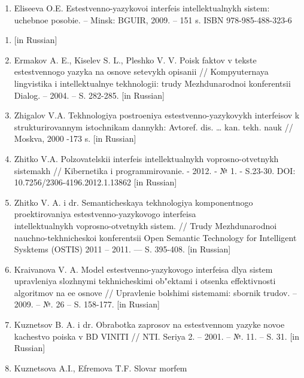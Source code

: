\begin{noparindent}
\begin{enumerate}
\def\labelenumi{\arabic{enumi}.}
\setcounter{enumi}{17}
\item
  Eliseeva O.E. Estestvenno-yazykovoi interfeis
  intellektual\textquotesingle nykh sistem: uchebnoe posobie. -- Minsk:
  BGUIR, 2009. -- 151 s. ISBN 978-985-488-323-6
\end{enumerate}

\begin{enumerate}
\def\labelenumi{\arabic{enumi}.}
\item
  {[}in Russian{]}
\item
  Ermakov A. E., Kiselev S. L., Pleshko V. V. Poisk faktov v tekste
  estestvennogo yazyka na osnove setevykh opisanii //
  Komp\textquotesingle yuternaya lingvistika i
  intellektual\textquotesingle nye tekhnologii: trudy Mezhdunarodnoi
  konferentsii Dialog. -- 2004. -- S. 282-285. {[}in Russian{]}
\item
  Zhigalov V.A. Tekhnologiya postroeniya estestvenno-yazykovykh
  interfeisov k strukturirovannym istochnikam dannykh: Avtoref. dis.
  \ldots{} kan. tekh. nauk // Moskva, 2000 -173 s. {[}in Russian{]}
\item
  Zhitko V.A. Pol\textquotesingle zovatel\textquotesingle skii interfeis
  intellektual\textquotesingle nykh voprosno-otvetnykh sistemakh //
  Kibernetika i programmirovanie. - 2012. - № 1. - S.23-30. DOI:
  10.7256/2306-4196.2012.1.13862 {[}in Russian{]}
\item
  Zhitko V. A. i dr. Semanticheskaya tekhnologiya komponentnogo
  proektirovaniya estestvenno-yazykovogo interfeisa
  \\intellektual\textquotesingle nykh voprosno-otvetnykh sistem. // Trudy
  Mezhdunarodnoi nauchno-tekhnicheskoi konferentsii Open Semantic
  Technology for Intelligent Sysktems (OSTIS) 2011 -- 2011. --- S.
  395-408. {[}in Russian{]}
\item
  Kraivanova V. A. Model\textquotesingle{} estestvenno-yazykovogo
  interfeisa dlya sistem upravleniya slozhnymi tekhnicheskimi ob"ektami
  i otsenka effektivnosti algoritmov na ee osnove // Upravlenie
  bol\textquotesingle shimi sistemami: sbornik trudov. -- 2009. -- №. 26
  -- S. 158-177. {[}in Russian{]}
\item
  Kuznetsov B. A. i dr. Obrabotka zaprosov na estestvennom yazyke novoe
  kachestvo poiska v BD VINITI // NTI. Seriya 2. -- 2001. -- №. 11. --
  S. 31. {[}in Russian{]}
\item
  Kuznetsova A.I., Efremova T.F. Slovar\textquotesingle{} morfem

\end{enumerate}
\end{noparindent}

